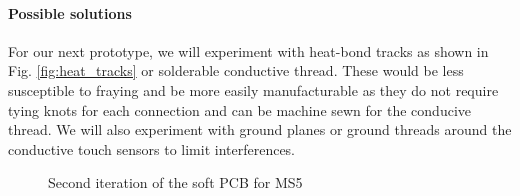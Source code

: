 \paragraph{Possible solutions} For our next prototype, we will experiment with heat-bond tracks as shown in Fig. \ref{fig:heat_tracks} or solderable conductive thread. These would be less susceptible to fraying and be more easily manufacturable as they do not require tying knots for each connection and can be machine sewn for the conducive thread. We will also experiment with ground planes or ground threads around the conductive touch sensors to limit interferences. 


\begin{figure}[ht]
    \centering
    \hfill
    \hfill
    \hfill
    \hfill
    \caption{Second iteration of the soft PCB for MS5}
    \label{fig:proto2}
\end{figure}


